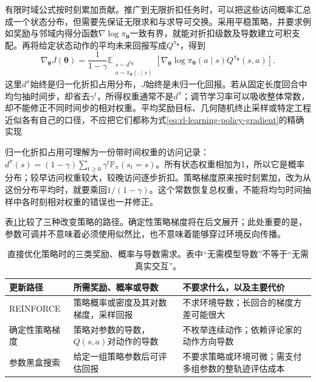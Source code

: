有限时域公式按时刻累加贡献。推广到无限折扣任务时，可以把这些访问概率汇总成一个状态分布，但需要先保证无限求和与求导可交换。采用平稳策略，并要求例如奖励与邻域内得分函数$\nabla\log\pi_{\bm\theta}$一致有界，就能对折扣级数及导数建立可积支配。再将给定状态动作的平均未来回报写成$Q^{\pi_{\bm\theta}}$，得到
\begin{equation}
  \nabla_{\bm\theta}J(\bm\theta)
    =\frac{1}{1-\gamma}
      \mathbb E_{\substack{s\sim d^{\pi_{\bm\theta}}\\
                           a\sim\pi_{\bm\theta}(\cdot\mid s)}}
        \left[\nabla_{\bm\theta}\log\pi_{\bm\theta}(a\mid s)
              Q^{\pi_{\bm\theta}}(s,a)\right].
  \label{eq:rl-learning-policy-gradient}
\end{equation}
这里$d^\pi$始终是归一化折扣占用分布，$J$始终是未归一化回报。若从固定长度回合中均匀抽时间步，却省去$\gamma^t$，所得权重通常不是$d^\pi$；调节学习率可以吸收整体常数，却不能修正不同时间步的相对权重。平均奖励目标、几何随机终止采样或特定工程近似各有自己的口径，不应把它们都称为式\eqref{eq:rl-learning-policy-gradient}的精确实现

归一化折扣占用可理解为一份带时间权重的访问记录：$d^\pi(s)=(1-\gamma)\sum_{t\geq0}\gamma^t\mathbb P_\pi(s_t=s)$。所有状态权重相加为1，所以它是概率分布；较早访问权重较大，较晚访问逐步折扣。策略梯度原来按时刻累加，改为从这份分布平均时，就要乘回$1/(1-\gamma)$。这个常数恢复总权重，不能将均匀时间抽样中各时刻相对权重的错误也一并修正。

表\ref{tab:rl-learning-policy-search-information}比较了三种改变策略的路径。确定性策略梯度将在后文展开；此处重要的是，参数可调并不意味着必须使用似然比，也不意味着能够穿过环境反向传播。

\begin{table}[t]
  \centering
  \small
  \begin{tabularx}{\linewidth}{>{\raggedright\arraybackslash}p{29mm} >{\raggedright\arraybackslash}X >{\raggedright\arraybackslash}X}
    \toprule
    更新路径 & 所需奖励、概率或导数 & 不要求什么，以及主要代价 \\
    \midrule
    REINFORCE & 策略概率或密度及其对数梯度，采样回报 & 不求环境导数；长回合的梯度方差可能很大 \\
    确定性策略梯度 & 策略对参数的导数，$Q(s,a)$对动作的导数 & 不枚举连续动作；依赖评论家的动作方向导数 \\
    参数黑盒搜索 & 给定一组策略参数后可评估回报 & 不要求策略或环境可微；需支付多组参数的整轨迹评估成本 \\
    \bottomrule
  \end{tabularx}
  \caption{直接优化策略时的三类奖励、概率与导数需求。表中“无需模型导数”不等于“无需真实交互”。}
  \label{tab:rl-learning-policy-search-information}
\end{table}

